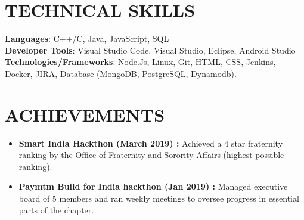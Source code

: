 \documentclass[letterpaper,11pt]{article}
\newcommand{\resumeItem}[1]{
  \item\small{
    {#1 \vspace{-2pt}}
  }
}
\newcommand{\resumeItemListStart}{\begin{itemize}}
\newcommand{\resumeItemListEnd}{\end{itemize}\vspace{-5pt}}
\begin{document}
\section{TECHNICAL SKILLS}
 \begin{itemize}[leftmargin=0.15in, label={}]
    \small{\item{
     \textbf{Languages}{: C++/C, Java, JavaScript, SQL} \\
     \textbf{Developer Tools}{: Visual Studio Code, Visual Studio, Eclipse, Android Studio} \\
     \textbf{Technologies/Frameworks}{: Node.Js, Linux, Git, HTML, CSS, Jenkins, Docker, JIRA, Database (MongoDB, PostgreSQL, Dynamodb).} \\
    }}
 \end{itemize}
 \vspace{-16pt}

\section{ACHIEVEMENTS}
    \resumeItemListStart
        \resumeItem{\textbf{Smart India Hackthon (March 2019) : }Achieved a 4 star fraternity ranking by the Office of Fraternity and Sorority Affairs (highest possible ranking).}
        \resumeItem{\textbf{Paymtm Build for India hackthon (Jan 2019) : }Managed executive board of 5 members and ran weekly meetings to oversee progress in essential parts of the chapter.}
    \resumeItemListEnd
\end{document}
